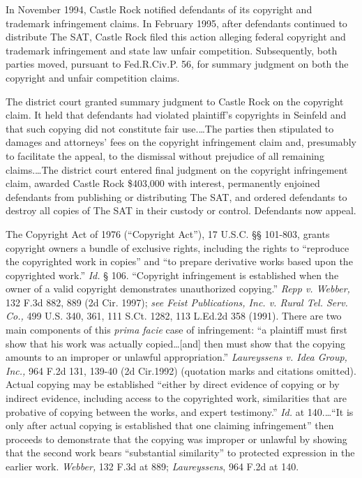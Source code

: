 In November 1994, Castle Rock notified defendants of its copyright and trademark
infringement claims. In February 1995, after defendants continued to distribute
The SAT, Castle Rock filed this action alleging federal copyright and trademark
infringement and state law unfair competition. Subsequently, both parties
moved, pursuant to Fed.R.Civ.P. 56, for summary judgment on both the copyright
and unfair competition claims.

The district court granted summary judgment to Castle Rock on the copyright
claim. It held that defendants had violated plaintiff's copyrights in Seinfeld
and that such copying did not constitute fair use.\ldots The parties then
stipulated to damages and attorneys' fees on the copyright infringement claim
and, presumably to facilitate the appeal, to the dismissal without prejudice of
all remaining claims.\ldots The district court entered final judgment on the
copyright infringement claim, awarded Castle Rock \$403,000 with interest,
permanently enjoined defendants from publishing or distributing The SAT, and
ordered defendants to destroy all copies of The SAT in their custody or
control. Defendants now appeal.


The Copyright Act of 1976 (``Copyright Act''), 17 U.S.C. {\S}{\S} 101-803,
grants copyright owners a bundle of exclusive rights, including the rights to
``reproduce the copyrighted work in copies'' and ``to prepare derivative works
based upon the copyrighted work.'' \textit{Id.} {\S} 106. ``Copyright
infringement is established when the owner of a valid copyright demonstrates
unauthorized copying.'' \textit{Repp v. Webber,} 132 F.3d 882, 889 (2d
Cir. 1997); \textit{see Feist Publications, Inc. v. Rural Tel. Serv. Co.,} 499
U.S. 340, 361, 111 S.Ct. 1282, 113 L.Ed.2d 358 (1991). There are two main
components of this \textit{prima facie} case of infringement: ``a plaintiff
must first show that his work was actually copied\ldots [and] then must show
that the copying amounts to an improper or unlawful appropriation.''
\textit{Laureyssens v. Idea Group, Inc.,} 964 F.2d 131, 139-40 (2d Cir.1992)
(quotation marks and citations omitted). Actual copying may be established
``either by direct evidence of copying or by indirect evidence, including
access to the copyrighted work, similarities that are probative of copying
between the works, and expert testimony.'' \textit{Id.} at 140.\ldots ``It is
only after actual copying is established that one claiming infringement'' then
proceeds to demonstrate that the copying was improper or unlawful by showing
that the second work bears ``substantial similarity'' to protected expression
in the earlier work. \textit{Webber,} 132 F.3d at 889; \textit{Laureyssens},
964 F.2d at 140.

